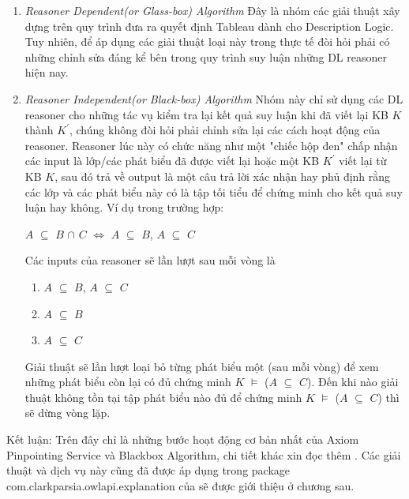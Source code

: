 \begin{enumerate}
	\item \textit{Reasoner Dependent(or Glass-box) Algorithm} Đây là nhóm các giải thuật xây dựng trên quy trình đưa ra quyết định Tableau dành cho Description Logic. Tuy nhiên, để áp dụng các giải thuật loại này trong thực tế đòi hỏi phải có những chỉnh sửa đáng kể bên trong quy trình suy luận những DL reasoner hiện nay.
	\item \textit{Reasoner Independent(or Black-box) Algorithm} Nhóm này chỉ sử dụng các DL reasoner cho những tác vụ kiểm tra lại kết quả suy luận khi đã viết lại KB $K$ thành $K^{'}$, chúng không đòi hỏi phải chỉnh sửa lại các cách hoạt động của reasoner. Reasoner lúc này có chức năng như một "chiếc hộp đen" chấp nhận các input là lớp/các phát biểu đã được viết lại hoặc một KB $K^{'}$ viết lại từ KB $K$, sau đó trả về output là một câu trả lời xác nhận hay phủ định rằng các lớp và các phát biểu này có là tập tối tiểu để chứng minh cho kết quả suy luận hay không. Ví dụ trong trường hợp:
	\begin{center}
		$A$ $\subseteq$ $B$ $\cap$ $C$ $\Leftrightarrow$ $A$ $\subseteq$ $B$, $A$ $\subseteq$ $C$
	\end{center}
	Các inputs của reasoner sẽ lần lượt sau mỗi vòng là 
	\begin{enumerate}
		\item $A$ $\subseteq$ $B$, $A$ $\subseteq$ $C$
		\item $A$ $\subseteq$ $B$
		\item $A$ $\subseteq$ $C$
	\end{enumerate}
	Giải thuật sẽ lần lượt loại bỏ từng phát biểu một (sau mỗi vòng) để xem những phát biểu còn lại có đủ chứng minh  $K$ $\models$ ($A$ $\subseteq$ $C$). Đến khi nào giải thuật không tồn tại tập phát biểu nào đủ để chứng minh $K$ $\models$ ($A$ $\subseteq$ $C$) thì sẽ dừng vòng lặp.
\end{enumerate}
Kết luận: Trên đây chỉ là những bước hoạt động cơ bản nhất của Axiom Pinpointing Service và Blackbox Algorithm, chi tiết khác xin đọc thêm \cite{axiomPinpoint}. Các giải thuật và dịch vụ này cũng đã được áp dụng trong package com.clarkparsia.owlapi.explanation của \cite{owowlapi} sẽ được giới thiệu ở chương sau.
